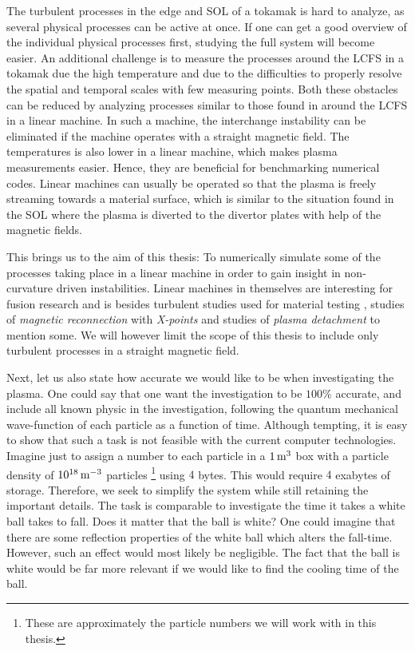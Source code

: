 The turbulent processes in the edge and SOL of a tokamak is hard to analyze, as several physical processes can be active at once.
If one can get a good overview of the individual physical processes first, studying the full system will become easier.
An additional challenge is to measure the processes around the LCFS in a tokamak due the high temperature and due to the difficulties to properly resolve the spatial and temporal scales with few measuring points.
Both these obstacles can be reduced by analyzing processes similar to those found in around the LCFS in a linear machine.
In such a machine, the interchange instability can be eliminated if the machine operates with a straight magnetic field.
The temperatures is also lower in a linear machine, which makes plasma measurements easier.
Hence, they are beneficial for benchmarking numerical codes.
Linear machines can usually be operated so that the plasma is freely streaming towards a material surface, which is similar to the situation found in the SOL where the plasma is diverted to the divertor plates with help of the magnetic fields.

This brings us to the aim of this thesis:
To numerically simulate some of the processes taking place in a linear machine in order to gain insight in non-curvature driven instabilities.
Linear machines in themselves are interesting for fusion research and is besides turbulent studies used for material testing \cite{Rapp2010}, studies of \emph{magnetic reconnection} with \emph{X-points} \cite{Bohlin2014} and studies of \emph{plasma detachment} \cite{Ohno2017} to mention some.
We will however limit the scope of this thesis to include only turbulent processes in a straight magnetic field.

Next, let us also state how accurate we would like to be when investigating the plasma.
One could say that one want the investigation to be $100 \%$ accurate, and include all known physic in the investigation, following the quantum mechanical wave-function of each particle as a function of time.
Although tempting, it is easy to show that such a task is not feasible with the current computer technologies.
Imagine just to assign a number to each particle in a $1\, \text{m}^3$ box with a particle density of $10^{18} \, \text{m}^{-3}$ particles%
\footnote{These are approximately the particle numbers we will work with in this thesis.}%
%
using $4$ bytes.
This would require $4$ exabytes of storage.
Therefore, we seek to simplify the system while still retaining the important details.
The task is comparable to investigate the time it takes a white ball takes to fall.
Does it matter that the ball is white?
One could imagine that there are some reflection properties of the white ball which alters the fall-time.
However, such an effect would most likely be negligible.
The fact that the ball is white would be far more relevant if we would like to find the cooling time of the ball.

